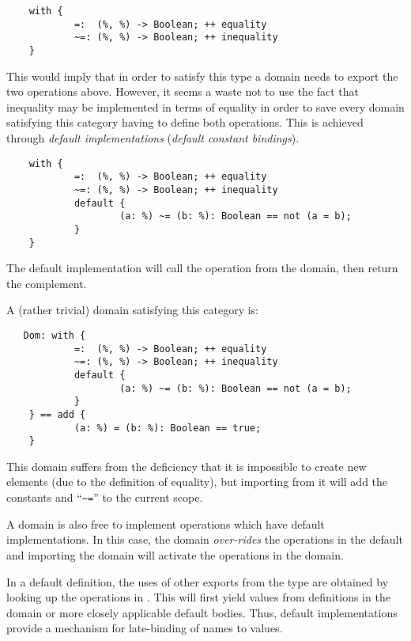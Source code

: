 {\begin{small}
\begin{verbatim}
    with {
            =:  (%, %) -> Boolean; ++ equality
            ~=: (%, %) -> Boolean; ++ inequality
    }
\end{verbatim}
\end{small}

This would imply that in order to satisfy this type a domain needs to
export the two operations above. However, it seems a waste not to use
the fact that inequality may be implemented in terms of equality in
order to save every domain satisfying this category having to define
both operations. This is achieved through
{\em default implementations\/} ({\em default constant bindings}). 

\begin{small}
\begin{verbatim}
    with {
            =:  (%, %) -> Boolean; ++ equality
            ~=: (%, %) -> Boolean; ++ inequality
            default {
                    (a: %) ~= (b: %): Boolean == not (a = b);
            }
    }
\end{verbatim}
\end{small}

The default implementation will call the \ttin{=} operation from the
domain, then return the complement.

A (rather trivial) domain satisfying this category is:

\begin{small}
\begin{verbatim}
   Dom: with {
            =:  (%, %) -> Boolean; ++ equality
            ~=: (%, %) -> Boolean; ++ inequality
            default {
                    (a: %) ~= (b: %): Boolean == not (a = b);
            }
    } == add {
            (a: %) = (b: %): Boolean == true;
    }
\end{verbatim}
\end{small}

This domain suffers from the deficiency that it is impossible to create
new elements (due to the definition of equality), but importing
from it will add the constants \ttin{=} and ``\verb+~=+'' to the current
scope.

A domain is also free to implement operations which have default
implementations. In this case, the domain {\em over-rides} the
operations in the default and importing the domain will activate the
operations in the domain.

In a default definition, the uses of other exports from the type
are obtained by looking up the operations in \ttin{\%}.
This will first yield values from definitions in the domain or more
closely applicable default bodies. Thus, default implementations
provide a mechanism for late-binding of names to values.

}
